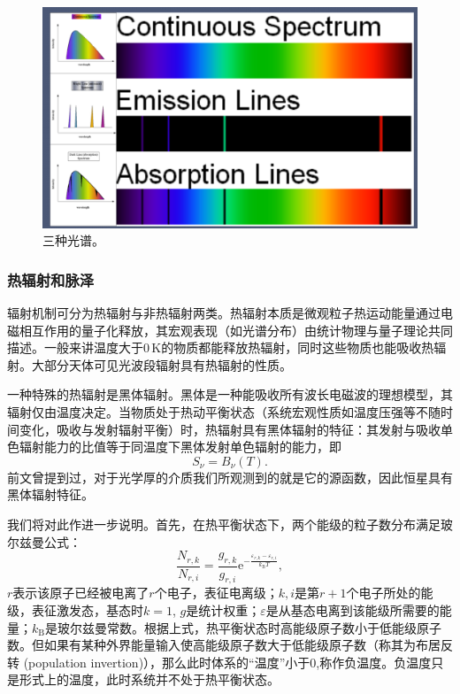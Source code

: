 \documentclass[../天体物理基础.tex]{subfiles}
\begin{document}
\begin{figure}[!htbp]
\centering
\includegraphics[width=12cm]{figures/figure1_4.png}
\captionsetup{justification=raggedright, singlelinecheck=false}
\caption{三种光谱。}
\label{三种光谱。}
\end{figure}

\subsubsection{热辐射和脉泽}
辐射机制可分为热辐射与非热辐射两类。热辐射本质是微观粒子热运动能量通过电磁相互作用的量子化释放，其宏观表现（如光谱分布）由统计物理与量子理论共同描述。一般来讲温度大于$0\,\mathrm{K}$的物质都能释放热辐射，同时这些物质也能吸收热辐射。大部分天体可见光波段辐射具有热辐射的性质。

一种特殊的热辐射是黑体辐射。黑体是一种能吸收所有波长电磁波的理想模型，其辐射仅由温度决定。当物质处于热动平衡状态（系统宏观性质如温度压强等不随时间变化，吸收与发射辐射平衡）时，热辐射具有黑体辐射的特征：其发射与吸收单色辐射能力的比值等于同温度下黑体发射单色辐射的能力，即
\begin{equation}
S_{\nu}=B_{\nu}\left(T\right).
\end{equation}
前文曾提到过，对于光学厚的介质我们所观测到的就是它的源函数，因此恒星具有黑体辐射特征。

我们将对此作进一步说明。首先，在热平衡状态下，两个能级的粒子数分布满足玻尔兹曼公式：
\begin{equation}
\frac{N_{r,k}}{N_{r,i}}=\frac{g_{r,k}}{g_{r,i}}\mathrm{e}^{-\frac{\varepsilon_{r,k}-\varepsilon_{r,i}}{k_{\text{B}}T}},\label{1.2.2}
\end{equation}
$r$表示该原子已经被电离了$r$个电子，表征电离级；$k,i$是第$r+1$个电子所处的能级，表征激发态，基态时$k=1$, $g$是统计权重；$\varepsilon$是从基态电离到该能级所需要的能量；$k_{\text{B}}$是玻尔兹曼常数。根据上式，热平衡状态时高能级原子数小于低能级原子数。但如果有某种外界能量输入使高能级原子数大于低能级原子数（称其为布居反转 (population invertion)），那么此时体系的“温度”小于$0$,称作负温度。负温度只是形式上的温度，此时系统并不处于热平衡状态。
\end{document}
